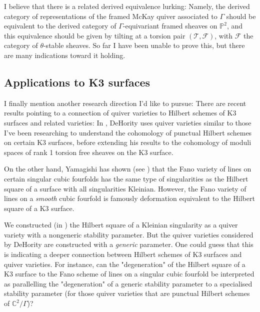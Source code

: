\documentclass[11pt,a4paper ]{article}        %
\newcommand{\C}{\mathbb{C}}    						%
\renewcommand{\P}{\mathbb{P}}  						%
\begin{document}
I believe that there is a related derived equivalence lurking: Namely, the derived category of representations of the framed McKay quiver associated to $\Gamma$ should be equivalent to the derived category of $\Gamma$-equivariant framed sheaves on $\P^2$, and this equivalence should be given by tilting at a torsion pair $(\mathcal{T}, \mathcal{F})$, with $\mathcal{F}$ the category of $\theta$-stable sheaves. So far I have been unable to prove this, but there are many indications toward it holding.

\subsection*{Applications to K3 surfaces}

I finally mention another research direction I'd like to pursue:
There are recent results pointing to a connection of quiver varieties to Hilbert schemes of K3 surfaces and related varieties:
In \cite{deHor}, DeHority uses quiver varieties similar to those I've been researching to understand the cohomology of punctual Hilbert schemes on certain K3 surfaces, before extending his results to the cohomology of moduli spaces of rank 1 torsion free sheaves on the K3 surface.

On the other hand, Yamagishi has shown (see \cite{Yamagishi}) that the Fano variety of lines on certain singular cubic fourfolds has the same type of singularities as the Hilbert square of a surface with all singularities Kleinian. However, the Fano variety of lines on a \emph{smooth} cubic fourfold is famously deformation equivalent to the Hilbert square of a K3 surface.

We constructed (in \cite{CGGS}) the Hilbert square of a Kleinian singularity as a quiver variety with a nongeneric stability parameter. But the quiver varieties considered by DeHority are constructed with a \emph{generic} parameter. One could guess that this is indicating a deeper connection between Hilbert schemes of K3 surfaces and quiver varieties. For instance, can the "degeneration" of the Hilbert square of a K3 surface to the Fano scheme of lines on a singular cubic fourfold be interpreted as parallelling the "degeneration" of a generic stability parameter to a specialised stability parameter (for those quiver varieties that are punctual Hilbert schemes of $ \C^2/\Gamma $)? 
\end{document}
